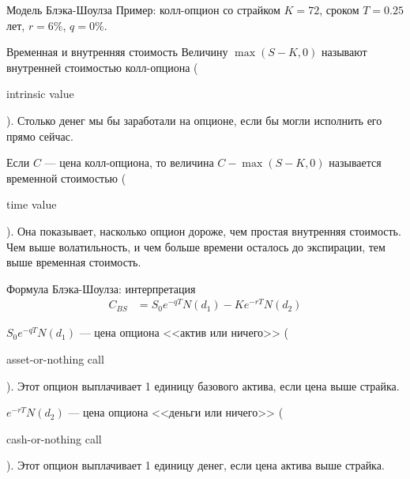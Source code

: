 \documentclass{beamer}
\newcommand{\en}[1]{\begin{otherlanguage}{english}#1\end{otherlanguage}}
\begin{document}
\begin{frame}{Модель Блэка-Шоулза}
\justify
Пример: колл-опцион со страйком $K=72$, сроком $T=0.25$ лет, $r=6\%$, $q=0\%$.

\centering
{}
\end{frame}



\begin{frame}{Временная и внутренняя стоимость}
\justify
Величину $\max(S - K, 0)$ называют внутренней стоимостью колл-опциона (\en{intrinsic value}). Столько денег мы бы заработали на опционе, если бы могли исполнить его прямо сейчас.

\justify
Если $C$ --- цена колл-опциона, то величина $C - \max(S - K, 0)$ называется временной стоимостью (\en{time value}). Она показывает, насколько опцион дороже, чем простая внутренняя стоимость. Чем выше волатильность, и чем больше времени осталось до экспирации, тем выше временная стоимость.
\end{frame}


\begin{frame}{Формула Блэка-Шоулза: интерпретация}
\begin{align*}
C_{BS} &= S_0e^{-qT}N(d_1) - Ke^{-rT}N(d_2)
\end{align*}

\justify
$S_0e^{-qT}N(d_1)$ --- цена опциона <<актив или ничего>> (\en{asset-or-nothing call}). Этот опцион выплачивает 1 единицу базового актива, если цена выше страйка.

\justify
$e^{-rT}N(d_2)$ --- цена опциона <<деньги или ничего>> (\en{cash-or-nothing call}). Этот опцион выплачивает 1 единицу денег, если цена актива выше страйка.
\end{frame}
\end{document}
